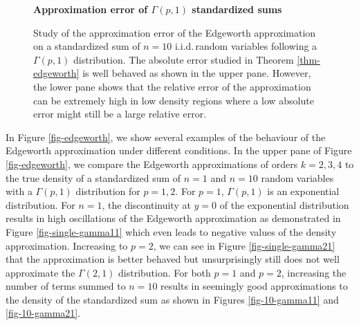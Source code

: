 \begin{example}
    
    \begin{figure}[!htbp]
        \textbf{Approximation error of $\Gamma(p,1)$ standardized sums}
        \centering
        \qquad
        \caption{Study of the approximation error of the Edgeworth approximation on a standardized sum of $n=10$ i.i.d.\,random variables following a $\Gamma(p, 1)$ distribution. The absolute error studied in Theorem \ref{thm-edgeworth} is well behaved as shown in the upper pane. However, the lower pane shows that the relative error of the approximation can be extremely high in low density regions where a low absolute error might still be a large relative error.}
        \label{fig-edgeworth-err}
    \end{figure}
    


    In Figure \ref{fig-edgeworth}, we show several examples of the behaviour of the Edgeworth approximation under different conditions. In the upper pane of Figure \ref{fig-edgeworth}, we compare the Edgeworth approximations of orders $k=2, 3, 4$ to the true density of a standardized sum of $n=1$ and $n=10$ random variables with a $\Gamma(p, 1)$ distribution for $p=1,2$. For $p=1$, $\Gamma(p, 1)$ is an exponential distribution. For $n = 1$, the discontinuity at $y = 0$ of the exponential distribution results in high oscillations of the Edgeworth approximation as demonstrated in Figure \ref{fig-single-gamma11} which even leads to negative values of the density approximation. Increasing to $p = 2$, we can see in Figure \ref{fig-single-gamma21} that the approximation is better behaved but unsurprisingly still does not well approximate the $\Gamma(2, 1)$ distribution. For both $p=1$ and $p=2$, increasing the number of terms summed to $n = 10$ results in seemingly good approximations to the density of the standardized sum as shown in Figures \ref{fig-10-gamma11} and \ref{fig-10-gamma21}.


\end{example}
